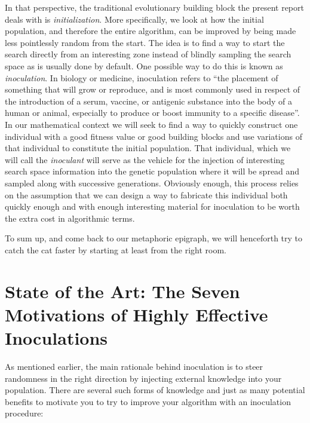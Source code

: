 \documentclass[english]{DESCARWINreport}
\begin{document}
In that perspective, the traditional evolutionary building block the present report deals with is \emph{initialization}. More specifically, we look at how the initial population, and therefore the entire algorithm, can be improved by being made less pointlessly random from the start. The idea is to find a way to start the search directly from an interesting zone instead of blindly sampling the search space as is usually done by default. One possible way to do this is known as \emph{inoculation}. In biology or medicine, inoculation refers to "`the placement of something that will grow or reproduce, and is most commonly used in respect of the introduction of a serum, vaccine, or antigenic substance into the body of a human or animal, especially to produce or boost immunity to a specific disease"'. In our mathematical context we will seek to find a way to quickly construct one individual with a good fitness value or good building blocks and use variations of that individual to constitute the initial population. That individual, which we will call the \emph{inoculant} will serve as the vehicle for the injection of interesting search space information into the genetic population where it will be spread and sampled along with successive generations.  Obviously enough, this process relies on the assumption that we can design a way to fabricate this individual both quickly enough and with enough interesting material for inoculation to be worth the extra cost in algorithmic terms.

To sum up, and come back to our metaphoric epigraph, we will henceforth try to catch the cat faster by starting at least from the right room.

\section{State of the Art: The Seven Motivations of Highly Effective Inoculations}


As mentioned earlier, the main rationale behind inoculation is to steer randomness in the right direction by injecting external knowledge into your population. There are several such forms of knowledge and just as many potential benefits to motivate you to try to improve your algorithm with an inoculation procedure:
\end{document}
